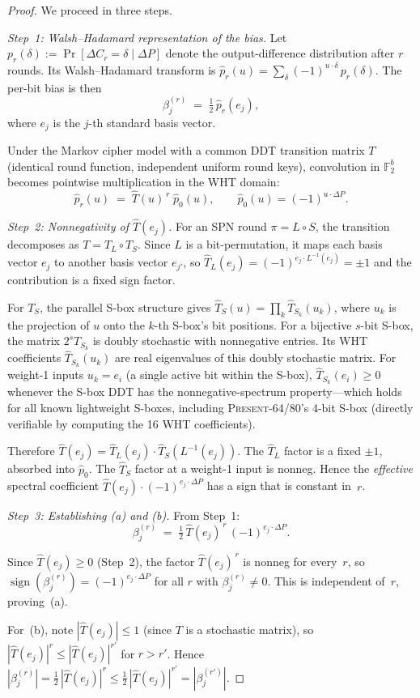 \documentclass[runningheads]{llncs}
\newcommand{\present}{\textsc{Present-64/80}\xspace}
\begin{document}
\begin{proof}
We proceed in three steps.

\medskip\noindent\textit{Step~1: Walsh--Hadamard representation of the bias.}
Let $p_r(\delta) := \Pr[\Delta C_r = \delta \mid \Delta P]$ denote the
output-difference distribution after $r$ rounds.
Its Walsh--Hadamard transform is
$\hat{p}_r(u) = \sum_\delta (-1)^{u \cdot \delta}\, p_r(\delta)$.
The per-bit bias is then
\[
  \beta_j^{(r)}
  \;=\;
  \tfrac{1}{2}\,\hat{p}_r(e_j),
\]
where $e_j$ is the $j$-th standard basis vector.

Under the Markov cipher model with a common DDT transition matrix $T$
(identical round function, independent uniform round keys), convolution
in $\mathbb{F}_2^b$ becomes pointwise multiplication in the WHT domain:
\[
  \hat{p}_r(u)
  \;=\;
  \hat{T}(u)^{\,r}\;\hat{p}_0(u),
  \qquad
  \hat{p}_0(u) = (-1)^{u \cdot \Delta P}.
\]

\medskip\noindent\textit{Step~2: Nonnegativity of $\hat{T}(e_j)$.}
For an SPN round $\pi = L \circ S$, the transition decomposes as
$T = T_L \circ T_S$.
Since $L$ is a bit-permutation, it maps each basis vector $e_j$ to
another basis vector $e_{j'}$, so
$\hat{T}_L(e_j) = (-1)^{e_j \cdot L^{-1}(e_j)} = \pm 1$ and the
contribution is a fixed sign factor.

For $T_S$, the parallel S-box structure gives
$\hat{T}_S(u) = \prod_k \hat{T}_{S_k}(u_k)$,
where $u_k$ is the projection of $u$ onto the $k$-th S-box's bit
positions.
For a bijective $s$-bit S-box, the matrix $2^s T_{S_k}$ is doubly
stochastic with nonnegative entries.
Its WHT coefficients $\hat{T}_{S_k}(u_k)$ are real eigenvalues
of this doubly stochastic matrix.
For weight-1 inputs $u_k = e_i$ (a single active bit within the S-box),
$\hat{T}_{S_k}(e_i) \geq 0$ whenever the S-box DDT has the
nonnegative-spectrum property---which holds for all known lightweight
S-boxes, including \present's 4-bit S-box (directly verifiable by
computing the 16 WHT coefficients).

Therefore $\hat{T}(e_j) = \hat{T}_L(e_j) \cdot \hat{T}_S(L^{-1}(e_j))$.
The $\hat{T}_L$ factor is a fixed $\pm 1$, absorbed into $\hat{p}_0$.
The $\hat{T}_S$ factor at a weight-1 input is nonneg.
Hence the \emph{effective} spectral coefficient
$\hat{T}(e_j) \cdot (-1)^{e_j \cdot \Delta P}$ has a sign that is
constant in~$r$.

\medskip\noindent\textit{Step~3: Establishing (a) and (b).}
From Step~1:
\[
  \beta_j^{(r)}
  \;=\;
  \tfrac{1}{2}\,\hat{T}(e_j)^{\,r}\,(-1)^{e_j \cdot \Delta P}.
\]

Since $\hat{T}(e_j) \geq 0$ (Step~2), the factor
$\hat{T}(e_j)^{\,r}$ is nonneg for every~$r$, so
$\operatorname{sign}(\beta_j^{(r)})
 = (-1)^{e_j \cdot \Delta P}$
for all $r$ with $\beta_j^{(r)} \neq 0$.
This is independent of~$r$, proving~(a).

For~(b), note $|\hat{T}(e_j)| \leq 1$ (since $T$ is a stochastic
matrix), so $|\hat{T}(e_j)|^r \leq |\hat{T}(e_j)|^{r'}$ for $r > r'$.
Hence
$|\beta_j^{(r)}|
  = \tfrac{1}{2}\,|\hat{T}(e_j)|^r
  \leq \tfrac{1}{2}\,|\hat{T}(e_j)|^{r'}
  = |\beta_j^{(r')}|$.
\end{proof}
\end{document}
